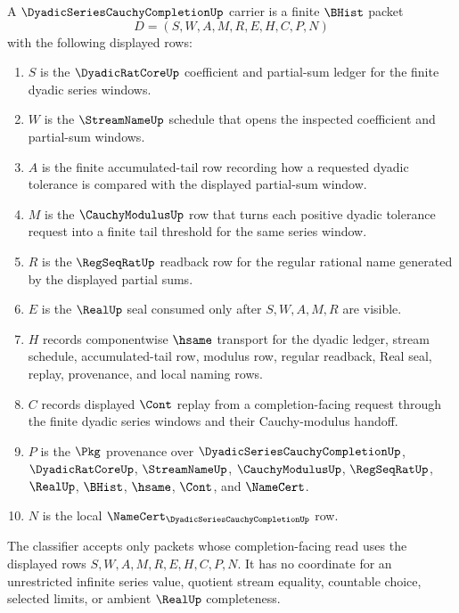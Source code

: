 \begin{definition}
\label{def:dyadic-series-cauchy-completion-carrier}
A $\DyadicSeriesCauchyCompletionUp$ carrier is a finite $\BHist$ packet
$$
D=(S,W,A,M,R,E,H,C,P,N)
$$
with the following displayed rows:
\begin{enumerate}
\item $S$ is the $\DyadicRatCoreUp$ coefficient and partial-sum ledger for the finite dyadic series windows.
\item $W$ is the $\StreamNameUp$ schedule that opens the inspected coefficient and partial-sum windows.
\item $A$ is the finite accumulated-tail row recording how a requested dyadic tolerance is compared with the displayed partial-sum window.
\item $M$ is the $\CauchyModulusUp$ row that turns each positive dyadic tolerance request into a finite tail threshold for the same series window.
\item $R$ is the $\RegSeqRatUp$ readback row for the regular rational name generated by the displayed partial sums.
\item $E$ is the $\RealUp$ seal consumed only after $S,W,A,M,R$ are visible.
\item $H$ records componentwise $\hsame$ transport for the dyadic ledger, stream schedule, accumulated-tail row, modulus row, regular readback, Real seal, replay, provenance, and local naming rows.
\item $C$ records displayed $\Cont$ replay from a completion-facing request through the finite dyadic series windows and their Cauchy-modulus handoff.
\item $P$ is the $\Pkg$ provenance over $\DyadicSeriesCauchyCompletionUp$, $\DyadicRatCoreUp$, $\StreamNameUp$, $\CauchyModulusUp$, $\RegSeqRatUp$, $\RealUp$, $\BHist$, $\hsame$, $\Cont$, and $\NameCert$.
\item $N$ is the local $\NameCert_{\DyadicSeriesCauchyCompletionUp}$ row.
\end{enumerate}
The classifier accepts only packets whose completion-facing read uses the displayed rows $S,W,A,M,R,E,H,C,P,N$. It has no coordinate for an unrestricted infinite series value, quotient stream equality, countable choice, selected limits, or ambient $\RealUp$ completeness.
\end{definition}


